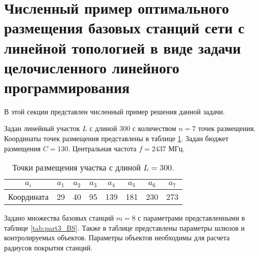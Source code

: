\section{Численный пример оптимального размещения базовых станций сети с линейной топологией в виде задачи целочисленного линейного программирования}\label{part4:ilp_solution}
В этой секции представлен численный пример решения данной задачи.

Задан линейный участок $L$ с длиной 300 с количеством $n=7$ точек размещения. Координаты точек размещения представлены в таблице \cref{tab:part3_placed_point}.  Задан бюджет размещения $C=130$. Центральная частота $f = 2437$ МГц. 

\begin{table}[h!]\centering
  \begin{tabular}{|c||c|c|c|c|c|c|c|}\hline
    $a_i$ & $a_1$ &  $a_2$ & $a_3$ & $a_4$ & $a_5$ & $a_6$ & $a_7$ \\ \hline \hline
    Координата & 29 & 40 & 95 & 139 & 181 & 230 & 273 \\ \hline
\end{tabular}\caption{Точки размещения участка с длиной $L = 300$.}\label{tab:part3_placed_point}
\end{table}

Задано множества базовых станций $m = 8$ с параметрами представленными в таблице \cref{tab:part3_BS}. Также в таблице представлены параметры шлюзов и контролируемых объектов. Параметры объектов необходимы для расчета радиусов покрытия станций.

